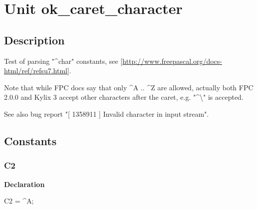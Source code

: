 \documentclass{report}
\newif\ifpdf
\begin{document}
\label{toc}\tableofcontents
\newpage
\newlength{\tmplength}
\chapter{Unit ok{\_}caret{\_}character}
\label{ok_caret_character}
\section{Description}
Test of parsing "{\^{}}char" constants, see [\href{http://www.freepascal.org/docs-html/ref/refsu7.html}{http://www.freepascal.org/docs-html/ref/refsu7.html}].\hfill\vspace*{1ex}



Note that while FPC docs say that only {\^{}}A .. {\^{}}Z are allowed, actually both FPC 2.0.0 and Kylix 3 accept other characters after the caret, e.g. "{\^{}}{\textbackslash}" is accepted.

See also bug report "[ 1358911 ] Invalid character in input stream".
\section{Constants}
\ifpdf
\subsection*{\large{\textbf{C2}}\normalsize\hspace{1ex}\hrulefill}
\else
\subsection*{C2}
\fi
\label{ok_caret_character-C2}
\begin{list}{}{
\setlength{\itemindent}{0cm}
\setlength{\listparindent}{0cm}
\setlength{\leftmargin}{\evensidemargin}
\addtolength{\leftmargin}{\tmplength}
\settowidth{\labelsep}{X}
\addtolength{\leftmargin}{\labelsep}
\setlength{\labelwidth}{\tmplength}
}
\item[\textbf{Declaration}\hfill]
\ifpdf
\begin{flushleft}
\fi
\begin{ttfamily}
C2 = {\^{}}A;\end{ttfamily}

\ifpdf
\end{flushleft}
\fi

\end{list}
\ifpdf
\end{document}
